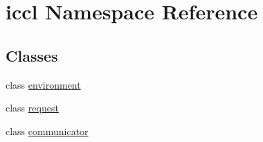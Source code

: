 \hypertarget{namespaceiccl}{\section{iccl Namespace Reference}
\label{namespaceiccl}
}
\subsection*{Classes}
\begin{DoxyCompactItemize}
\item 
class \hyperlink{classiccl_1_1environment}{environment}
\item 
class \hyperlink{classiccl_1_1request}{request}
\item 
class \hyperlink{classiccl_1_1communicator}{communicator}
\end{DoxyCompactItemize}

